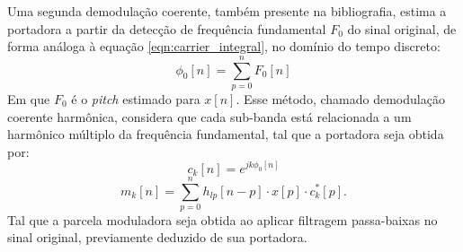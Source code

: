 Uma segunda demodulação coerente, também presente na bibliografia, estima a
portadora a partir da detecção de frequência fundamental $F_0$ do sinal
original, de forma análoga à equação \ref{eqn:carrier_integral}, no domínio do
tempo discreto:
\begin{equation}
    \phi_0[n] = \sum_{p=0}^n F_0[n]
\end{equation}
Em que $F_0$ é o \textit{pitch} estimado para $x[n]$. Esse método, chamado
demodulação coerente harmônica, considera que cada sub-banda está relacionada a
um harmônico múltiplo da frequência fundamental, tal que a portadora seja obtida
por:
\begin{equation}
    c_k[n] = e^{jk\phi_0[n]}
\end{equation}
\begin{equation}
    m_k[n] = \sum^n_{p=0} h_{lp}[n-p] \cdot x[p] \cdot c^*_k[p].
\end{equation}
Tal que a parcela moduladora seja obtida ao aplicar filtragem passa-baixas no
sinal original, previamente deduzido de sua portadora.